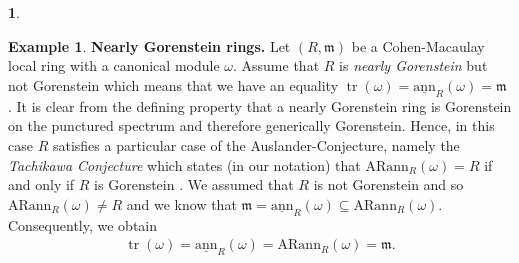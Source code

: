 \documentclass[12pt]{amsart}
\newcommand{\sann}{\underline{\mathrm{ann}}}
\newcommand{\arann}{\mathrm{ARann}}
\newcommand{\m}{\mathfrak{m}}
\theoremstyle{definition}
\newtheorem{example}[theorem]{Example}
\newtheorem{chunk}[theorem]{}
\numberwithin{equation}{theorem}
\DeclareMathOperator{\tr}{\mathrm{tr}}
\begin{document}
\begin{chunk}
    \begin{example}\label{nearly-gorenstein-example}
        \textbf{Nearly Gorenstein rings.}
        Let $(R, \m)$ be a Cohen-Macaulay local ring with a canonical module $\omega$. Assume that $R$ is \textit{nearly Gorenstein} but not Gorenstein which means that we have an equality $\tr(\omega) = \sann_R(\omega) = \m$ \cite{Herzog-Takayuki-Dumitru}. It is clear from the defining property that a nearly Gorenstein ring is Gorenstein on the punctured spectrum and therefore generically Gorenstein. Hence, in this case $R$ satisfies a particular case of the Auslander-Conjecture, namely the \textit{Tachikawa Conjecture} which states (in our notation) that $\arann_R(\omega) = R$ if and only if $R$ is Gorenstein \cite{Avramov-Buchweitz-Sega}. We assumed that $R$ is not Gorenstein and so $\arann_R(\omega) \neq R$ and we know that $\m = \sann_R(\omega) \subseteq \arann_R(\omega)$. Consequently, we obtain 
        \begin{align*}
            \tr(\omega) = \sann_R(\omega) = \arann_R(\omega) = \m.
        \end{align*}
        
    \end{example}
\end{chunk}
 
\end{document}
